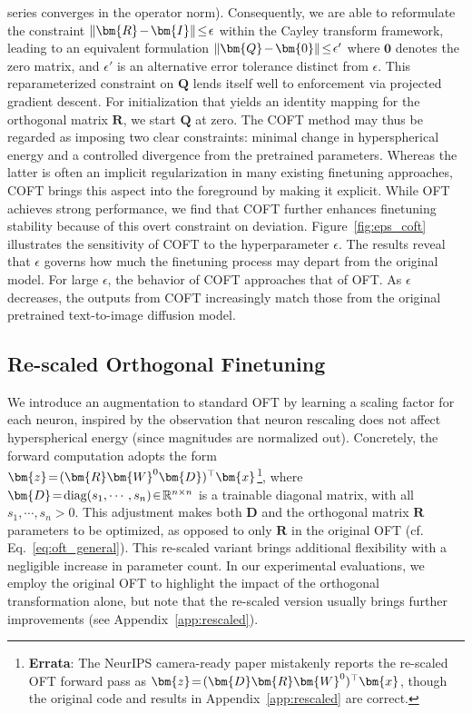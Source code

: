 series converges in the operator norm). Consequently, we are able to reformulate the constraint $\thickmuskip=2mu \medmuskip=2mu\|\bm{R}-\bm{I}\|\leq\epsilon$ within the Cayley transform framework, leading to an equivalent formulation $\thickmuskip=2mu \medmuskip=2mu \|\bm{Q}-\bm{0}\|\leq\epsilon'$ where $\bm{0}$ denotes the zero matrix, and $\epsilon'$ is an alternative error tolerance distinct from $\epsilon$. This reparameterized constraint on $\bm{Q}$ lends itself well to enforcement via projected gradient descent. For initialization that yields an identity mapping for the orthogonal matrix $\bm{R}$, we start $\bm{Q}$ at zero. The COFT method may thus be regarded as imposing two clear constraints: minimal change in hyperspherical energy and a controlled divergence from the pretrained parameters. Whereas the latter is often an implicit regularization in many existing finetuning approaches, COFT brings this aspect into the foreground by making it explicit. While OFT achieves strong performance, we find that COFT further enhances finetuning stability because of this overt constraint on deviation. Figure~\ref{fig:eps_coft} illustrates the sensitivity of COFT to the hyperparameter $\epsilon$. The results reveal that $\epsilon$ governs how much the finetuning process may depart from the original model. For large $\epsilon$, the behavior of COFT approaches that of OFT. As $\epsilon$ decreases, the outputs from COFT increasingly match those from the original pretrained text-to-image diffusion model.

\subsection{Re-scaled Orthogonal Finetuning}

We introduce an augmentation to standard OFT by learning a scaling factor for each neuron, inspired by the observation that neuron rescaling does not affect hyperspherical energy (since magnitudes are normalized out). Concretely, the forward computation adopts the form $\thickmuskip=2mu \medmuskip=2mu\bm{z}=(\bm{R}\bm{W}^0\bm{D})^\top\bm{x}$\footnote{\textbf{Errata}: The NeurIPS camera-ready paper mistakenly reports the re-scaled OFT forward pass as $\thickmuskip=2mu \medmuskip=2mu\bm{z}=(\bm{D}\bm{R}\bm{W}^0)^\top\bm{x}$, though the original code and results in Appendix~\ref{app:rescaled} are correct.}, where $\thickmuskip=2mu \medmuskip=2mu \bm{D}=\text{diag}(s_1,\cdots,s_n)\in\mathbb{R}^{n\times n}$ is a trainable diagonal matrix, with all $s_1,\cdots,s_n>0$. This adjustment makes both $\bm{D}$ and the orthogonal matrix $\bm{R}$ parameters to be optimized, as opposed to only $\bm{R}$ in the original OFT (cf. Eq.~\eqref{eq:oft_general}). This re-scaled variant brings additional flexibility with a negligible increase in parameter count. In our experimental evaluations, we employ the original OFT to highlight the impact of the orthogonal transformation alone, but note that the re-scaled version usually brings further improvements (see Appendix~\ref{app:rescaled}).

